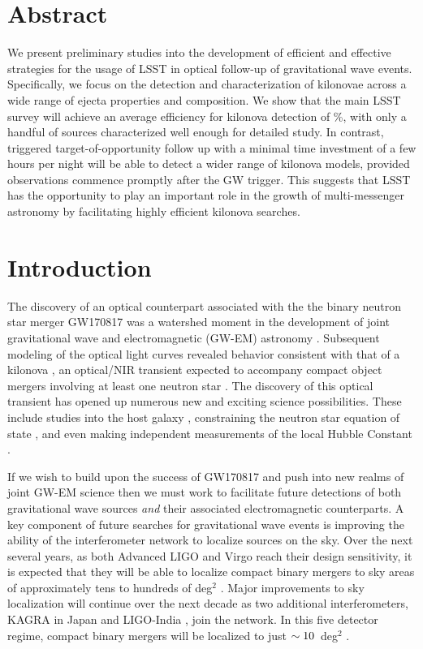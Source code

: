 \section*{Abstract}
We present preliminary studies into the development of efficient and effective strategies for the usage of LSST in optical follow-up of gravitational wave events. Specifically, we focus on the detection and characterization of kilonovae across a wide range of ejecta properties and composition. We show that the main LSST survey will achieve an average efficiency for kilonova detection of \%, with only a handful of sources characterized well enough for detailed study. In contrast, triggered target-of-opportunity follow up with a minimal time investment of a few hours per night will be able to detect a wider range of kilonova models, provided observations commence promptly after the GW trigger. This suggests that LSST has the opportunity to play an important role in the growth of multi-messenger astronomy by facilitating highly efficient kilonova searches.

\clearpage
\section{Introduction}
\label{sec:ch6_intro}
The discovery of an optical counterpart associated with the the binary neutron star merger GW170817 was a watershed moment in the development of joint gravitational wave and electromagnetic (GW-EM) astronomy \citep{LIGOGW170817,LIGOMMAPaper,Arcavi+17,Coulter+17,GW170817DECam,Valenti+17}. Subsequent modeling of the optical light curves revealed behavior consistent with that of a kilonova \citep{Cowp+17,Kilpatrick+17,Tanaka+17,Villar+17b, Tanaka+18}, an optical/NIR transient expected to accompany compact object mergers involving at least one neutron star \citep[see e.g.,][]{Metzger2017}. The discovery of this optical transient has opened up numerous new and exciting science possibilities. These include studies into the host galaxy \citep[NGC4993, see e.g.,][]{Blanchard+17,Cantiello+18}, constraining the neutron star equation of state \citep[see e.g.,][]{Radice+18}, and even making independent measurements of the local Hubble Constant \citep[H$_0$, see e.g.,][]{LIGOH0,Guidorzi+17}.

If we wish to build upon the success of GW170817 and push into new realms of joint GW-EM science then we must work to facilitate future detections of both gravitational wave sources {\em and} their associated electromagnetic counterparts. A key component of future searches for gravitational wave events is improving the ability of the interferometer network to localize sources on the sky. Over the next several years, as both Advanced LIGO and Virgo reach their design sensitivity, it is expected that they will be able to localize compact binary mergers to sky areas of approximately tens to hundreds of deg$^2$ \citep{LIGOLocalization,ChenHolz16}. Major improvements to sky localization will continue over the next decade as two additional interferometers, KAGRA in Japan \citep{KAGRA} and LIGO-India \citep{LIGOIndia}, join the network. In this five detector regime, compact binary mergers will be localized to just $\sim10$~deg$^2$ \citep{Fairhurst2014,ChenHolz16}.

